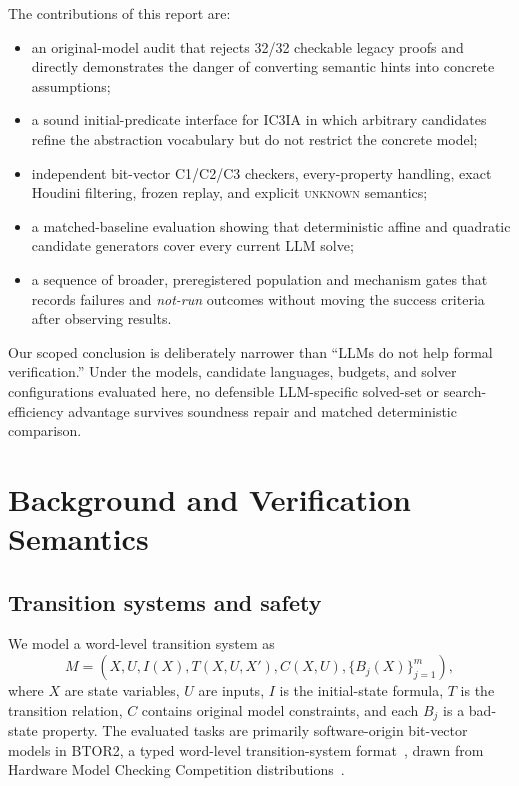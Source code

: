 \documentclass[10pt]{article}
\newcommand{\icthreeia}{\textsc{IC3IA}}
\newcommand{\btor}{\textsc{BTOR2}}
\newcommand{\unknown}{\textsc{unknown}}
\begin{document}
The contributions of this report are:
\begin{itemize}
  \item an original-model audit that rejects 32/32 checkable legacy proofs and
        directly demonstrates the danger of converting semantic hints into
        concrete assumptions;
  \item a sound initial-predicate interface for \icthreeia{} in which arbitrary
        candidates refine the abstraction vocabulary but do not restrict the
        concrete model;
  \item independent bit-vector C1/C2/C3 checkers, every-property handling,
        exact Houdini filtering, frozen replay, and explicit \unknown{}
        semantics;
  \item a matched-baseline evaluation showing that deterministic affine and
        quadratic candidate generators cover every current LLM solve;
  \item a sequence of broader, preregistered population and mechanism gates
        that records failures and \emph{not-run} outcomes without moving the
        success criteria after observing results.
\end{itemize}

Our scoped conclusion is deliberately narrower than ``LLMs do not help formal
verification.''  Under the models, candidate languages, budgets, and solver
configurations evaluated here, no defensible LLM-specific solved-set or
search-efficiency advantage survives soundness repair and matched deterministic
comparison.

\section{Background and Verification Semantics}
\label{sec:semantics}

\subsection{Transition systems and safety}

We model a word-level transition system as
\[
  M=(X,U,I(X),T(X,U,X'),C(X,U),\{B_j(X)\}_{j=1}^{m}),
\]
where $X$ are state variables, $U$ are inputs, $I$ is the initial-state
formula, $T$ is the transition relation, $C$ contains original model
constraints, and each $B_j$ is a bad-state property.  The evaluated tasks are
primarily software-origin bit-vector models in \btor{}, a typed word-level
transition-system format~\cite{Niemetz2018BTOR2}, drawn from Hardware Model
Checking Competition distributions~\cite{HWMCC}.
\end{document}
